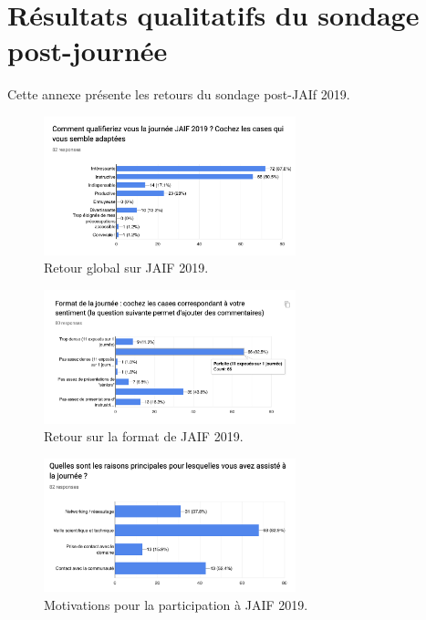 \documentclass[a4paper,11pt]{article}
\begin{document}
\appendix

\section{Résultats qualitatifs du sondage post-journée}
\label{sec:org8591a7a}

\label{annexe:sondage}
Cette annexe présente les retours du sondage post-JAIf 2019.

\begin{figure}[h]
\centering
\includegraphics[width=0.65\textwidth]{images/retour_qualificatif_jaif2019.png}
\caption{Retour global sur JAIF 2019.}
\end{figure}

\begin{figure}[h]
\centering
\includegraphics[width=0.65\textwidth]{images/retour_format_jaif2019.png}
\caption{Retour sur la format de JAIF 2019.}
\end{figure}

\begin{figure}[h]
\centering
\includegraphics[width=0.65\textwidth]{images/motivations_jaif2019.png}
\caption{Motivations pour la participation à JAIF 2019.}
\end{figure}
\end{document}
